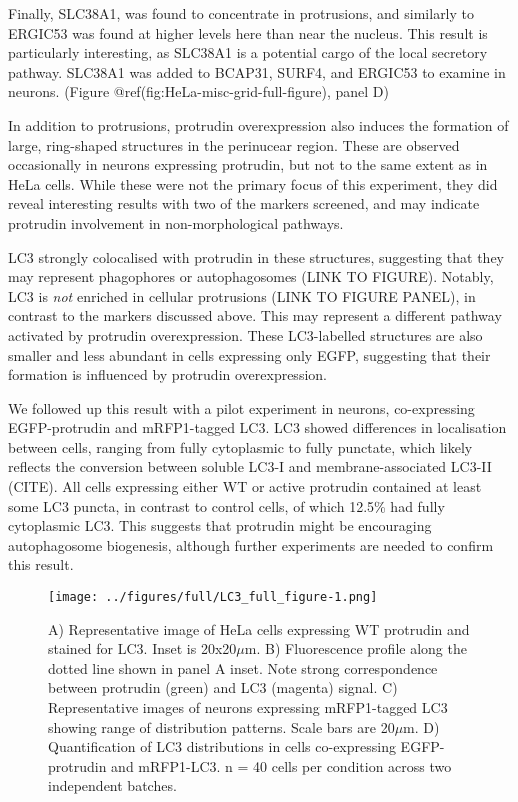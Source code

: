 \documentclass[
  12pt,
  a4paper,
]{article}
\begin{document}
Finally, SLC38A1, was found to concentrate in protrusions, and similarly
to ERGIC53 was found at higher levels here than near the nucleus. This
result is particularly interesting, as SLC38A1 is a potential cargo of
the local secretory pathway. SLC38A1 was added to BCAP31, SURF4, and
ERGIC53 to examine in neurons. (Figure
@ref(fig:HeLa-misc-grid-full-figure), panel D)

In addition to protrusions, protrudin overexpression also induces the
formation of large, ring-shaped structures in the perinucear region.
These are observed occasionally in neurons expressing protrudin, but not
to the same extent as in HeLa cells. While these were not the primary
focus of this experiment, they did reveal interesting results with two
of the markers screened, and may indicate protrudin involvement in
non-morphological pathways.

LC3 strongly colocalised with protrudin in these structures, suggesting
that they may represent phagophores or autophagosomes (LINK TO FIGURE).
Notably, LC3 is \emph{not} enriched in cellular protrusions (LINK TO
FIGURE PANEL), in contrast to the markers discussed above. This may
represent a different pathway activated by protrudin overexpression.
These LC3-labelled structures are also smaller and less abundant in
cells expressing only EGFP, suggesting that their formation is
influenced by protrudin overexpression.

We followed up this result with a pilot experiment in neurons,
co-expressing EGFP-protrudin and mRFP1-tagged LC3. LC3 showed
differences in localisation between cells, ranging from fully
cytoplasmic to fully punctate, which likely reflects the conversion
between soluble LC3-I and membrane-associated LC3-II (CITE). All cells
expressing either WT or active protrudin contained at least some LC3
puncta, in contrast to control cells, of which 12.5\% had fully
cytoplasmic LC3. This suggests that protrudin might be encouraging
autophagosome biogenesis, although further experiments are needed to
confirm this result.

\begin{figure}
\centering
\texttt{[image: ../figures/full/LC3\_full\_figure-1.png]}
\caption{A) Representative image of HeLa cells expressing WT protrudin
and stained for LC3. Inset is 20x20\(\mu\)m. B) Fluorescence profile
along the dotted line shown in panel A inset. Note strong correspondence
between protrudin (green) and LC3 (magenta) signal. C) Representative
images of neurons expressing mRFP1-tagged LC3 showing range of
distribution patterns. Scale bars are 20\(\mu\)m. D) Quantification of
LC3 distributions in cells co-expressing EGFP-protrudin and mRFP1-LC3. n
= 40 cells per condition across two independent batches.}
\end{figure}
\end{document}
